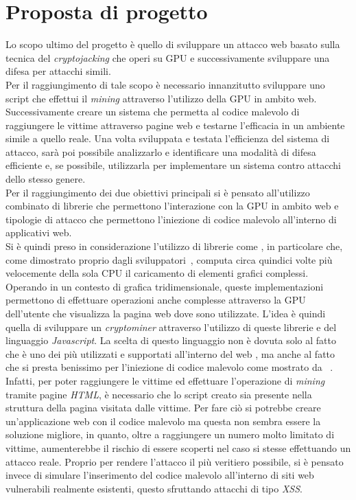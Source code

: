 \documentclass[
11pt, %
oneside, %
italian, %
onehalfspacing,%
headsepline, %
]{MastersDoctoralThesis} %
\newcommand\citen[1]{\citeauthor{#1} \citep{#1}}
\begin{document}
{\chapter{Proposta di progetto}}
Lo scopo ultimo del progetto è quello di sviluppare un attacco web basato sulla tecnica del \emph{cryptojacking} che operi su GPU e successivamente sviluppare una difesa per attacchi simili.\\
Per il raggiungimento di tale scopo è necessario innanzitutto sviluppare uno script che effettui il \emph{mining} attraverso l'utilizzo della GPU in ambito web. Successivamente creare un sistema che permetta al codice malevolo di raggiungere le vittime attraverso pagine web e testarne l'efficacia in un ambiente simile a quello reale. Una volta sviluppata e testata l'efficienza del sistema di attacco, sarà poi possibile analizzarlo e identificare una modalità di difesa efficiente e, se possibile, utilizzarla per implementare un sistema contro attacchi dello stesso genere.\\
Per il raggiungimento dei due obiettivi principali si è pensato all'utilizzo combinato di librerie che permettono l'interazione con la GPU in ambito web e  tipologie di attacco che permettono l'iniezione di codice malevolo all'interno di applicativi web.\\
Si è quindi preso in considerazione l'utilizzo di librerie come , in particolare  che, come dimostrato proprio dagli sviluppatori~\citep{banchmarkGPU.js}, computa circa quindici volte più velocemente della sola CPU il caricamento di elementi grafici complessi. Operando in un contesto di grafica tridimensionale, queste implementazioni permettono di effettuare operazioni anche complesse attraverso la GPU dell'utente che visualizza la pagina web dove sono utilizzate. L'idea è quindi quella di sviluppare un \emph{cryptominer} attraverso l'utilizzo di queste librerie e del linguaggio \emph{Javascript}. La scelta di questo linguaggio non è dovuta solo al fatto che è uno dei più utilizzati e supportati all'interno del web \citep{w3techsJavascriptPopularity}, ma anche al fatto che si presta benissimo per l'iniezione di codice malevolo come mostrato da~\citen{owaspxss}.\\
Infatti, per poter raggiungere le vittime ed effettuare l'operazione di \emph{mining} tramite pagine \emph{HTML}, è necessario che lo script creato sia presente nella struttura della pagina visitata dalle vittime. Per fare ciò si potrebbe creare un'applicazione web con il codice malevolo ma questa non sembra essere la soluzione migliore, in quanto, oltre a raggiungere un numero molto limitato di vittime, aumenterebbe il rischio di essere scoperti nel caso si stesse effettuando un attacco reale. Proprio per rendere l'attacco il più veritiero possibile, si è pensato invece di simulare l'inserimento del codice malevolo all'interno di siti web vulnerabili realmente esistenti, questo sfruttando attacchi di tipo \emph{XSS}.\\
\end{document}
